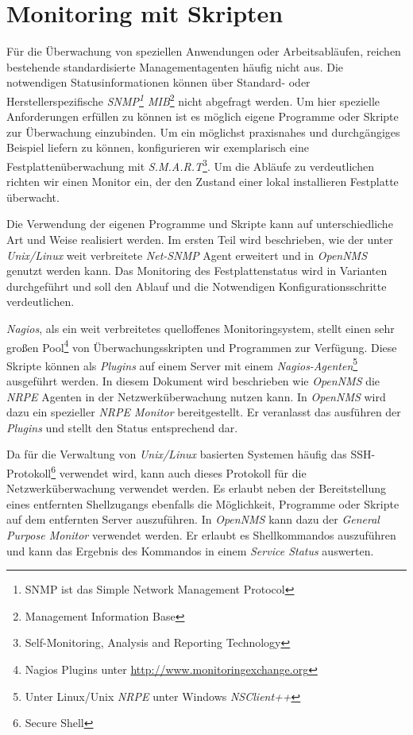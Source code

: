 \section{Monitoring mit Skripten}
Für die Überwachung von speziellen Anwendungen oder Arbeitsabläufen, reichen bestehende standardisierte Managementagenten häufig nicht aus. Die notwendigen Statusinformationen können über Standard- oder Herstellerspezifische \emph{SNMP\footnote{SNMP ist das Simple Network Management Protocol} MIB}\footnote{Management Information Base} nicht abgefragt werden. Um hier spezielle Anforderungen erfüllen zu können ist es möglich eigene Programme oder Skripte zur Überwachung einzubinden. Um ein möglichst praxisnahes und durchgängiges Beispiel liefern zu können, konfigurieren wir exemplarisch eine Festplattenüberwachung mit \emph{S.M.A.R.T}\footnote{Self-Monitoring, Analysis and Reporting Technology}. Um die Abläufe zu verdeutlichen richten wir einen  Monitor ein, der den Zustand einer lokal installieren Festplatte überwacht.

Die Verwendung der eigenen Programme und Skripte kann auf unterschiedliche Art und Weise realisiert werden. Im ersten Teil wird beschrieben, wie der unter \emph{Unix/Linux} weit verbreitete \emph{Net-SNMP} Agent erweitert und in \emph{OpenNMS} genutzt werden kann. Das Monitoring des Festplattenstatus wird in Varianten durchgeführt und soll den Ablauf und die Notwendigen Konfigurationsschritte verdeutlichen.

\emph{Nagios}, als ein weit verbreitetes quelloffenes Monitoringsystem, stellt einen sehr großen Pool\footnote{Nagios Plugins unter \url{http://www.monitoringexchange.org}} von Überwachungsskripten und Programmen zur Verfügung. Diese Skripte können als \emph{Plugins} auf einem Server mit einem \emph{Nagios-Agenten}\footnote{Unter Linux/Unix \emph{NRPE} unter Windows \emph{NSClient++}} ausgeführt werden. In diesem Dokument wird beschrieben wie \emph{OpenNMS} die \emph{NRPE} Agenten in der Netzwerküberwachung nutzen kann. In \emph{OpenNMS} wird dazu ein spezieller \emph{NRPE Monitor} bereitgestellt. Er veranlasst das ausführen der \emph{Plugins} und stellt den Status entsprechend dar.

Da für die Verwaltung von \emph{Unix/Linux} basierten Systemen häufig das SSH-Protokoll\footnote{Secure Shell} verwendet wird, kann auch dieses Protokoll für die Netzwerküberwachung verwendet werden. Es erlaubt neben der Bereitstellung eines entfernten Shellzugangs ebenfalls die Möglichkeit, Programme oder Skripte auf dem entfernten Server auszuführen. In \emph{OpenNMS} kann dazu der \emph{General Purpose Monitor} verwendet werden. Er erlaubt es Shellkommandos auszuführen und kann das Ergebnis des Kommandos in einem \emph{Service Status} auswerten.

